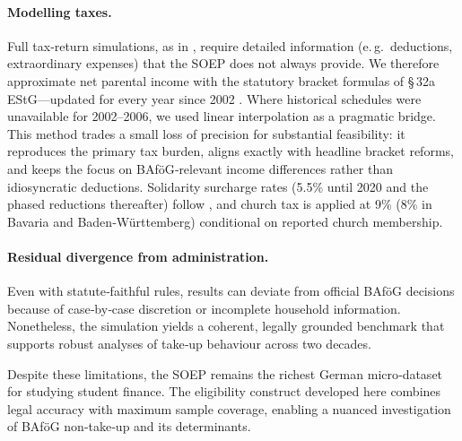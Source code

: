 \paragraph{Modelling taxes.}
Full tax‑return simulations, as in \cite{herber_non-take-up_2019}, require detailed information (e.\,g.\ deductions, extraordinary expenses) that the SOEP does not always provide.  
We therefore approximate net parental income with the statutory bracket formulas of §\,32a EStG—updated for every year since 2002 \citep{estg_law,estg_2025,estg_2024,estg_2023,estg_2022,estg_2021,estg_2020,estg_2019,estg_2018,estg_2017,estg_2016,estg_2015,estg_2014,estg_2013,estg_2012,estg_2007,estg_2006,estg_lohninfo_2012}.  
Where historical schedules were unavailable for 2002–2006, we used linear interpolation as a pragmatic bridge.  
This method trades a small loss of precision for substantial feasibility: it reproduces the primary tax burden, aligns exactly with headline bracket reforms, and keeps the focus on BAföG‑relevant income differences rather than idiosyncratic deductions.  
Solidarity surcharge rates (5.5\% until 2020 and the phased reductions thereafter) follow \citet{solzg_2018,solzg_2019,solzg_2023}, and church tax is applied at 9\% (8\% in Bavaria and Baden‑Württemberg) conditional on reported church membership.

\paragraph{Residual divergence from administration.}
Even with statute‑faithful rules, results can deviate from official BAföG decisions because of case‑by‑case discretion or incomplete household information.  Nonetheless, the simulation yields a coherent, legally grounded benchmark that supports robust analyses of take‑up behaviour across two decades.

Despite these limitations, the SOEP remains the richest German micro‑dataset for studying student finance.  The eligibility construct developed here combines legal accuracy with maximum sample coverage, enabling a nuanced investigation of BAföG non‑take‑up and its determinants.

